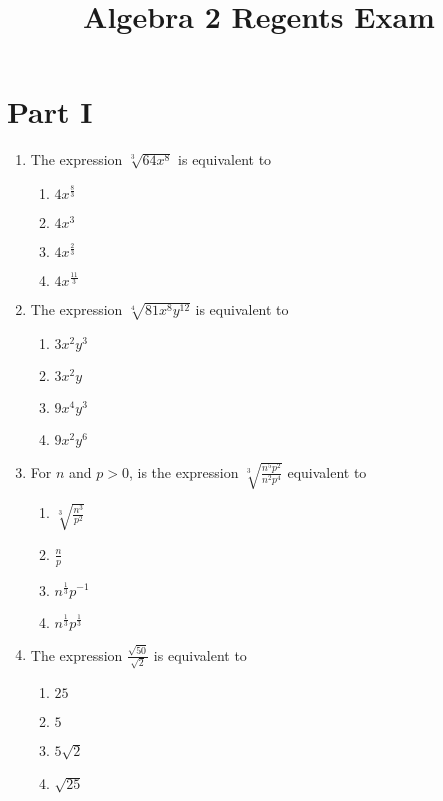\documentclass[12pt, twoside]{article}
\title{Algebra 2 Regents Exam}
\begin{document}
\maketitle

\section*{Part I}

\begin{enumerate}%


\item The expression \( \sqrt[3]{64x^8} \) is equivalent to
\begin{enumerate}
    \item \( 4x^{\frac{8}{3}} \)
    \item \( 4x^3 \)
    \item \( 4x^{\frac{2}{3}} \)
    \item \( 4x^{\frac{11}{3}} \)
\end{enumerate}

\item The expression \( \sqrt[4]{81x^8y^{12}} \) is equivalent to
\begin{enumerate}
    \item \( 3x^2y^3 \)
    \item \( 3x^2y \)
    \item \( 9x^4y^3 \)
    \item \( 9x^2y^6 \)
\end{enumerate}

\item For \( n \) and \( p > 0 \), is the expression \( \sqrt[3]{\frac{n^5 p^2}{n^2 p^4}} \) equivalent to
\begin{enumerate}
    \item \( \sqrt[3]{\frac{n^3}{p^2}} \)
    \item \( \frac{n}{p} \)
    \item \( n^{\frac{1}{3}} p^{-1} \)
    \item \( n^{\frac{1}{3}} p^{\frac{1}{3}} \)
\end{enumerate}


\item The expression \( \frac{\sqrt{50}}{\sqrt{2}} \) is equivalent to
\begin{enumerate}
    \item \( 25 \)
    \item \( 5 \)
    \item \( 5\sqrt{2} \)
    \item \( \sqrt{25} \)
\end{enumerate}


\end{enumerate}
\end{document}
